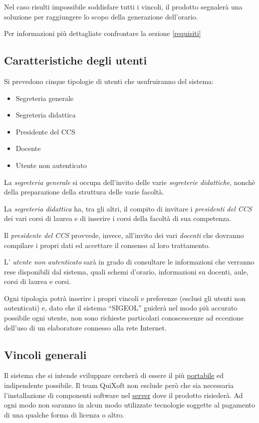 \documentclass[11pt,a4paper]{article}
\begin{document}
Nel caso risulti impossibile soddisfare tutti i vincoli, il prodotto segnalerà una soluzione per raggiungere lo scopo della generazione dell'orario.

Per informazioni più dettagliate confrontare la sezione \ref{requisiti}
\subsection{Caratteristiche degli utenti} \label{utenti}
Si prevedono cinque tipologie di utenti che usufruiranno del sistema:
\begin{itemize}
 \item Segreteria generale
 \item Segreteria didattica
 \item Presidente del CCS
 \item Docente
 \item Utente non autenticato
\end{itemize}

La \textit{segreteria generale} si occupa dell'invito delle varie \textit{segreterie didattiche}, nonchè della preparazione della struttura delle varie facoltà.

La \textit{segreteria didattica} ha, tra gli altri, il compito di invitare i \textit{presidenti del CCS} dei vari corsi di laurea e di inserire i corsi della facoltà di sua competenza.

Il \textit{presidente del CCS} provvede, invece, all'invito dei vari \textit{docenti} che dovranno compilare i propri dati ed accettare il consenso al loro trattamento.

L' \textit{utente non autenticato} sarà in grado di consultare le informazioni che verranno rese disponibili dal sistema, quali schemi d'orario, informazioni su docenti, aule, corsi di laurea e corsi.

Ogni tipologia potrà inserire i propri vincoli e preferenze (esclusi gli utenti non autenticati) e, dato che il sistema ``SIGEOL'' guiderà nel modo più accurato possibile ogni utente, non sono richieste particolari conoscescenze ad eccezione dell'uso di un elaboratore connesso alla rete Internet.
\subsection{Vincoli generali}
Il sistema che si intende sviluppare cercherà di essere il più \underline{portabile} ed indipendente possibile. Il team QuiXoft non esclude però che sia necessaria l'installazione di componenti software nel \underline{server} dove il prodotto risiederà. Ad ogni modo non saranno in alcun modo utilizzate tecnologie soggette al pagamento di una qualche forma di licenza o altro.
\end{document}
